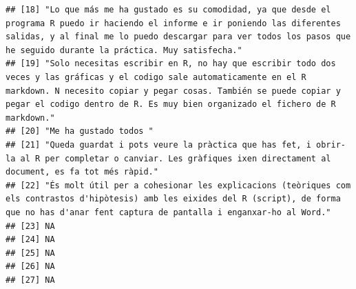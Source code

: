 \documentclass[
]{article}
\begin{document}
\begin{verbatim}
## [18] "Lo que más me ha gustado es su comodidad, ya que desde el programa R puedo ir haciendo el informe e ir poniendo las diferentes salidas, y al final me lo puedo descargar para ver todos los pasos que he seguido durante la práctica. Muy satisfecha."                      
## [19] "Solo necesitas escribir en R, no hay que escribir todo dos veces y las gráficas y el codigo sale automaticamente en el R markdown. N necesito copiar y pegar cosas. También se puede copiar y pegar el codigo dentro de R. Es muy bien organizado el fichero de R markdown."
## [20] "Me ha gustado todos "                                                                                                                                                                                                                                                       
## [21] "Queda guardat i pots veure la pràctica que has fet, i obrir-la al R per completar o canviar. Les gràfiques ixen directament al document, es fa tot més ràpid."                                                                                                              
## [22] "És molt útil per a cohesionar les explicacions (teòriques com els contrastos d'hipòtesis) amb les eixides del R (script), de forma que no has d'anar fent captura de pantalla i enganxar-ho al Word."                                                                       
## [23] NA                                                                                                                                                                                                                                                                           
## [24] NA                                                                                                                                                                                                                                                                           
## [25] NA                                                                                                                                                                                                                                                                           
## [26] NA                                                                                                                                                                                                                                                                           
## [27] NA                                                                                                                                                                                                                                                                           

\end{verbatim}
\end{document}
